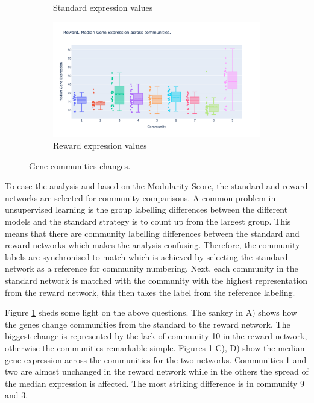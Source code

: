 \begin{figure}[!htb]
\begin{subfigure}[b]{0.47\textwidth}
        \caption{Standard expression values}
    \end{subfigure}
    \hfill
    \begin{subfigure}[b]{0.47\textwidth}
        \centering
        \includegraphics[width=\textwidth,keepaspectratio]{Sections/Network_I/Resources/P0/Comms/P0_norm3_4K_50TF_med.png}
        \caption{Reward expression values}
    \end{subfigure}
    \hfill
    \caption{Gene communities changes.}
    \label{fig:N_I:p0_comm_chgs}
\end{figure}


To ease the analysis and based on the Modularity Score, the standard and reward networks are selected for community comparisons. A common problem in unsupervised learning is the group labelling differences between the different models and the standard strategy is to count up from the largest group. This means that there are community labelling differences between the standard and reward networks which makes the analysis confusing. Therefore, the community labels are synchronised to match which is achieved by selecting the standard network as a reference for community numbering. Next, each community in the standard network is matched with the community with the highest representation from the reward network, this then takes the label from the reference labeling.

Figure \ref{fig:N_I:p0_comm_chgs} sheds some light on the above questions. The sankey in A) shows 
how the genes change communities from the standard to the reward network. The biggest change is represented by the lack of community 10 in the reward network, otherwise the communities remarkable simple. Figures \ref{fig:N_I:p0_comm_chgs} C), D) show the median gene expression across the communities for the two networks. Communities 1 and two are almost unchanged in the reward network while in the others the spread of the median expression is affected. The most striking difference is in community 9 and 3.  

